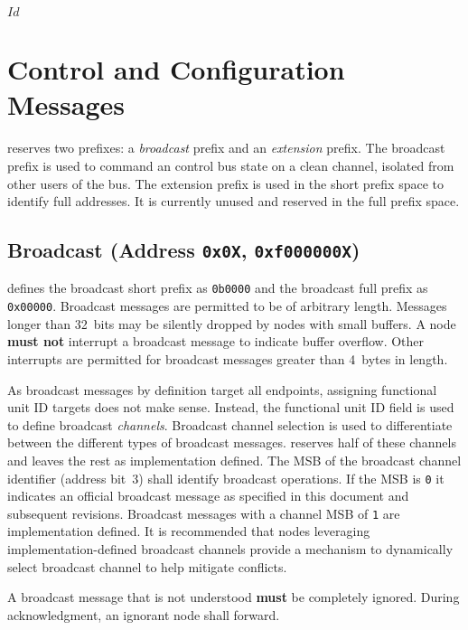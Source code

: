 \svnInfo $Id$

\section{Control and Configuration Messages}
\label{sec:control}

\bus reserves two prefixes: a {\em broadcast} prefix and an {\em extension}
prefix. The broadcast prefix is used to command an control bus state on a
clean channel, isolated from other users of the bus. The extension prefix is
used in the short prefix space to identify full addresses. It is currently
unused and reserved in the full prefix space.

\subsection{Broadcast (Address \texttt{0x0X}, \texttt{0xf000000X})}
\label{sec:control-broadcast}
\bus defines the broadcast short prefix as {\tt 0b0000} and the broadcast full
prefix as {\tt 0x00000}. Broadcast messages
are permitted to be of arbitrary length. Messages longer than 32~bits may be
silently dropped by nodes with small buffers. A node \textbf{must not}
interrupt a broadcast message to indicate buffer overflow. Other interrupts
are permitted for broadcast messages greater than 4~bytes in length.

As broadcast messages by definition target all endpoints, assigning functional
unit ID targets does not make sense. Instead, the functional unit ID field is
used to define broadcast {\em channels}. Broadcast channel selection is used
to differentiate between the different types of broadcast messages. \bus
reserves half of these channels and leaves the rest as implementation defined.
%
The MSB of the broadcast channel identifier (address bit~3) shall identify
\bus broadcast operations. If the MSB is {\tt 0} it indicates an official \bus
broadcast message as specified in this document and subsequent revisions.
Broadcast messages with a channel MSB of {\tt 1} are implementation defined.
It is recommended that nodes leveraging implementation-defined broadcast
channels provide a mechanism to dynamically select broadcast channel to help
mitigate conflicts.

A broadcast message that is not understood \textbf{must} be completely
ignored. During acknowledgment, an ignorant node shall forward.

